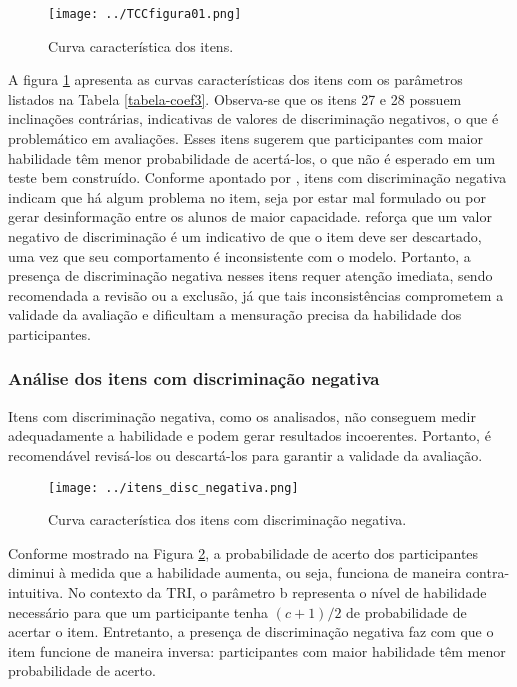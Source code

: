 \begin{figure}[!htb]
	\centering
	\texttt{[image: ../TCCfigura01.png]}
	\caption{Curva característica dos itens.}
	\label{fig:curva_itens}
\end{figure}

A figura \ref{fig:curva_itens} apresenta as curvas características dos itens com os parâmetros listados na Tabela \ref{tabela-coef3}. Observa-se que os itens 27 e 28 possuem inclinações contrárias, indicativas de valores de discriminação negativos, o que é problemático em avaliações. Esses itens sugerem que participantes com maior habilidade têm menor probabilidade de acertá-los, o que não é esperado em um teste bem construído. Conforme apontado por , itens com discriminação negativa indicam que há algum problema no item, seja por estar mal formulado ou por gerar desinformação entre os alunos de maior capacidade.  reforça que um valor negativo de discriminação é um indicativo de que o item deve ser descartado, uma vez que seu comportamento é inconsistente com o modelo. Portanto, a presença de discriminação negativa nesses itens requer atenção imediata, sendo recomendada a revisão ou a exclusão, já que tais inconsistências comprometem a validade da avaliação e dificultam a mensuração precisa da habilidade dos participantes.


\subsubsection{Análise dos itens com discriminação negativa}

Itens com discriminação negativa, como os analisados, não conseguem medir adequadamente a habilidade e podem gerar resultados incoerentes. Portanto, é recomendável revisá-los ou descartá-los para garantir a validade da avaliação.


\begin{figure}[!htb]
	\centering
	\texttt{[image: ../itens\_disc\_negativa.png]}
	\caption{Curva característica dos itens com discriminação negativa.}
	\label{fig:itens_disc_negativa}
\end{figure}


Conforme mostrado na Figura \ref{fig:itens_disc_negativa}, a probabilidade de acerto dos participantes diminui à medida que a habilidade aumenta, ou seja, funciona de maneira contra-intuitiva. No contexto da TRI, o parâmetro b representa o nível de habilidade necessário para que um participante tenha $(c+1)/2$ de probabilidade de acertar o item. Entretanto, a presença de discriminação negativa faz com que o item funcione de maneira inversa: participantes com maior habilidade têm menor probabilidade de acerto.

